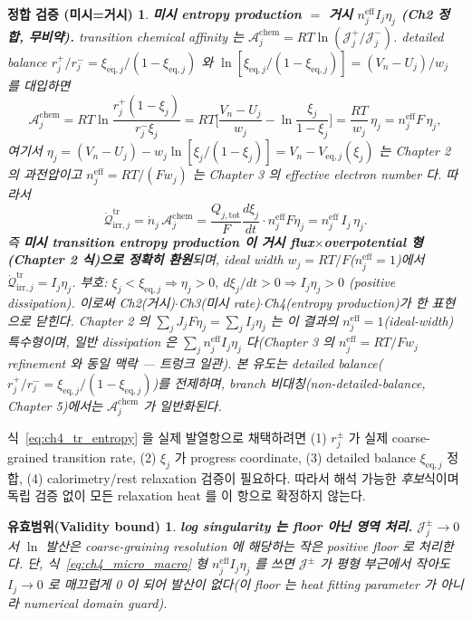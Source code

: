\documentclass[11pt,a4paper]{article}
\newtheorem*{boundbox}{유효범위(Validity bound)}
\newtheorem*{verifybox}{정합 검증 (미시=거시)}
\newcommand{\eff}{\mathrm{eff}}
\newcommand{\eq}{\mathrm{eq}}
\newcommand{\tot}{\mathrm{tot}}
\newcommand{\irr}{\mathrm{irr}}
\newcommand{\tr}{\mathrm{tr}}
\begin{document}
\begin{verifybox}
\textbf{미시 entropy production $=$ 거시 $n_j^{\eff}I_j\eta_j$ (Ch2 정합, 무비약).} transition chemical
affinity 는 $\mathcal A_j^{\mathrm{chem}}=RT\ln(\mathcal J_j^+/\mathcal J_j^-)$. detailed balance
$r_j^+/r_j^-=\xi_{\eq,j}/(1-\xi_{\eq,j})$ 와 $\ln[\xi_{\eq,j}/(1-\xi_{\eq,j})]=(V_n-U_j)/w_j$ 를 대입하면
\begin{equation}
\mathcal A_j^{\mathrm{chem}}=RT\ln\!\frac{r_j^+(1-\xi_j)}{r_j^-\xi_j}
=RT\Big[\frac{V_n-U_j}{w_j}-\ln\frac{\xi_j}{1-\xi_j}\Big]
=\frac{RT}{w_j}\,\eta_j=n_j^{\eff}F\,\eta_j,
\label{eq:ch4_affinity_eta}
\end{equation}
여기서 $\eta_j=(V_n-U_j)-w_j\ln[\xi_j/(1-\xi_j)]=V_n-V_{\eq,j}(\xi_j)$ 는 Chapter 2 의 과전압이고
$n_j^{\eff}=RT/(Fw_j)$ 는 Chapter 3 의 effective electron number 다. 따라서
\begin{equation}
\dot{\mathcal Q}_{\irr,j}^{\tr}=\dot n_j\,\mathcal A_j^{\mathrm{chem}}
=\frac{Q_{j,\tot}}{F}\frac{d\xi_j}{dt}\cdot n_j^{\eff}F\eta_j
=n_j^{\eff}\,I_j\,\eta_j.
\label{eq:ch4_micro_macro}
\end{equation}
즉 \textbf{미시 transition entropy production 이 거시 flux$\times$overpotential 형(Chapter 2 식)으로 정확히
환원}되며, ideal width $w_j=RT/F$($n_j^{\eff}=1$)에서 $\dot{\mathcal Q}_{\irr,j}^{\tr}=I_j\eta_j$. 부호:
$\xi_j<\xi_{\eq,j}\Rightarrow\eta_j>0,\ d\xi_j/dt>0\Rightarrow I_j\eta_j>0$ (positive dissipation). 이로써
Ch2(거시)$\cdot$Ch3(미시 rate)$\cdot$Ch4(entropy production)가 한 표현으로 닫힌다.
\emph{Chapter 2 의 $\sum_jJ_jF\eta_j=\sum_jI_j\eta_j$ 는 이 결과의 $n_j^{\eff}=1$(ideal-width) 특수형}이며,
일반 dissipation 은 $\sum_j n_j^{\eff}I_j\eta_j$ 다(Chapter 3 의 $n_j^{\eff}=RT/Fw_j$ refinement 와 동일
맥락 — 트렁크 일관). 본 유도는 detailed balance($r_j^+/r_j^-=\xi_{\eq,j}/(1-\xi_{\eq,j})$)를 전제하며,
branch 비대칭(non-detailed-balance, Chapter 5)에서는 $\mathcal A_j^{\mathrm{chem}}$ 가 일반화된다.
\end{verifybox}

식~\eqref{eq:ch4_tr_entropy} 을 실제 발열항으로 채택하려면 (1) $r_j^\pm$ 가 실제 coarse-grained transition
rate, (2) $\xi_j$ 가 progress coordinate, (3) detailed balance $\xi_{\eq,j}$ 정합, (4) calorimetry/rest
relaxation 검증이 필요하다. 따라서 해석 가능한 \emph{후보}식이며 독립 검증 없이 모든 relaxation heat 를
이 항으로 확정하지 않는다.
\begin{boundbox}
\textbf{log singularity 는 floor 아닌 영역 처리.} $\mathcal J_j^\pm\to0$ 서 $\ln$ 발산은 coarse-graining
resolution 에 해당하는 작은 positive floor 로 처리한다. 단, 식~\eqref{eq:ch4_micro_macro} 형
$n_j^{\eff}I_j\eta_j$ 를 쓰면 $\mathcal J^\pm$ 가 평형 부근에서 작아도 $I_j\to0$ 로 매끄럽게 0 이 되어
발산이 없다(이 floor 는 heat fitting parameter 가 아니라 numerical domain guard).
\end{boundbox}
\end{document}
